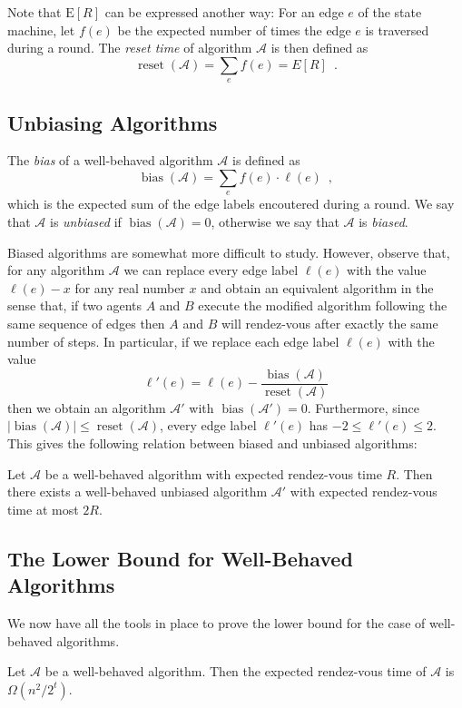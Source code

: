 \documentclass[lotsofwhite]{patmorin}
\newcommand{\E}{\mathrm{E}}
\newcommand{\A}{\mathcal{A}}
\DeclareMathOperator{\bias}{bias}
\DeclareMathOperator{\reset}{reset}
\begin{document}
Note that $\E[R]$ can be expressed another way: For an edge $e$ of the
state machine, let $f(e)$ be the expected number of times the edge $e$
is traversed during a round.  The
\emph{reset time} of algorithm $\A$ is then defined as
\[
   \reset(\A) = \sum_e f(e) = E[R] \enspace .
\]

\subsection{Unbiasing Algorithms}

The \emph{bias} of a well-behaved algorithm $\A$ is defined as
\[
    \bias(\A) = \sum_{e} f(e)\cdot\ell(e) \enspace ,
\]
which is the expected sum of the edge labels encoutered during a round.
We say that $\A$ is \emph{unbiased} if $\bias(\A)=0$, otherwise we say
that $\A$ is \emph{biased}.

Biased algorithms are somewhat more difficult to study.  However,
observe that, for any algorithm $\mathcal{A}$ we can replace every
edge label $\ell(e)$ with the value $\ell(e)-x$ for any real number
$x$ and obtain an equivalent algorithm in the sense that, if two
agents $A$ and $B$ execute the modified algorithm following the same
sequence of edges then $A$ and $B$ will rendez-vous after exactly the
same number of steps.  In particular, if we replace each edge label
$\ell(e)$ with the value
\[
   \ell'(e) = \ell(e) - \frac{\bias(\A)}{\reset(\A)}
\]
then we obtain an algorithm $\A'$ with $\bias(\A')=0$.  Furthermore, since
$|\bias(\A)|\le\reset(\A)$, every edge label $\ell'(e)$ has
$-2 \le \ell'(e)\le 2$.  This gives the following relation between
biased and unbiased algorithms:

\begin{lem}
Let $\A$ be a well-behaved algorithm with expected rendez-vous time
$R$.  Then there exists a well-behaved unbiased algorithm $\A'$ with
expected rendez-vous time at most $2R$.
\end{lem}

\subsection{The Lower Bound for Well-Behaved Algorithms}

We now have all the tools in place to prove the lower bound for the
case of well-behaved algorithms.

\begin{lem}
Let $\A$ be a well-behaved algorithm.  Then the expected rendez-vous
time of $\A$ is $\Omega(n^2/2^t)$.
\end{lem}
\end{document}
